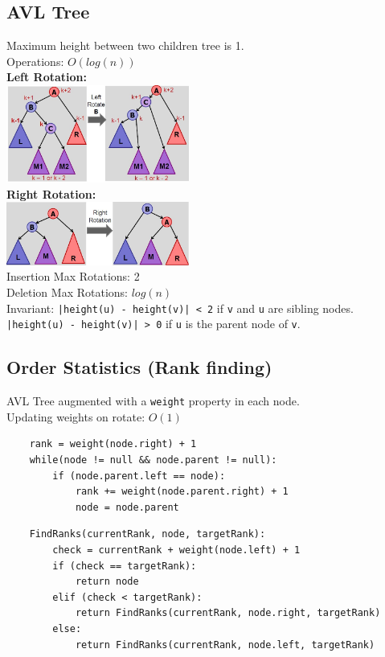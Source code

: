 \documentclass[10pt,landscape,a4paper]{article}
\begin{document}
\begin{multicols*}{4}
\subsection{AVL Tree}
Maximum height between two children tree is 1. \\
Operations: $O(log(n))$ \\
\textbf{Left Rotation:} \\
\includegraphics[width = 6cm]{left-rotate} \\
\textbf{Right Rotation:} \\
\includegraphics[width = 6cm]{right-rotate} \\
Insertion Max Rotations: 2 \\
Deletion Max Rotations: $log(n)$ \\
Invariant: \texttt{|height(u) - height(v)| < 2} if \texttt{v} and \texttt{u} are sibling nodes. \texttt{|height(u) - height(v)| > 0} if \texttt{u} is the parent node of \texttt{v}.

\subsection{Order Statistics (Rank finding)}
AVL Tree augmented with a \texttt{weight} property in each node. \\
Updating weights on rotate: $O(1)$ \\

\begin{lstlisting}
    rank = weight(node.right) + 1
    while(node != null && node.parent != null):
	    if (node.parent.left == node):
		    rank += weight(node.parent.right) + 1
		    node = node.parent
\end{lstlisting}

\begin{lstlisting}
    FindRanks(currentRank, node, targetRank):
	    check = currentRank + weight(node.left) + 1
	    if (check == targetRank):
		    return node
	    elif (check < targetRank):
		    return FindRanks(currentRank, node.right, targetRank)
	    else:
		    return FindRanks(currentRank, node.left, targetRank)
\end{lstlisting}


\end{multicols*}
\end{document}
